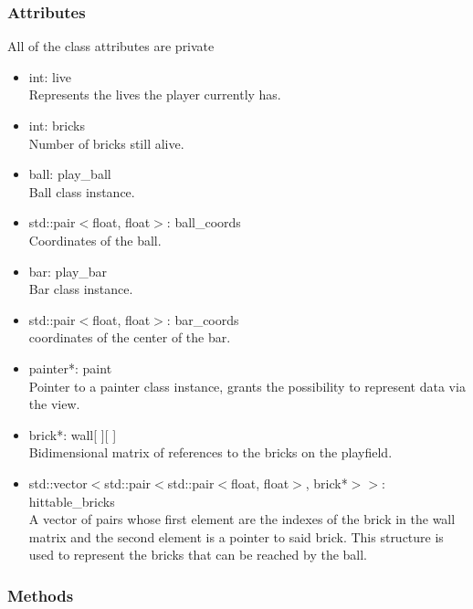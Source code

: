 \documentclass[]{article}
\begin{document}
\subsubsection{Attributes}
All of the class attributes are private
	\begin{itemize}
		\item int: live \\Represents the lives the player currently has.
		\item int: bricks \\Number of bricks still alive.
		\item ball: play\_ball \\Ball class instance.
		\item std::pair$<$float, float$>$: ball\_coords\\Coordinates of the ball.
		\item bar: play\_bar\\Bar class instance.
		\item std::pair$<$float, float$>$: bar\_coords\\coordinates of the center of the bar.
		\item painter*: paint \\ Pointer to a painter class instance, grants the possibility to represent data via the view.
		\item brick*: wall[ ][ ] \\Bidimensional matrix of references to the bricks on the playfield.
		\item std::vector$<$std::pair$<$std::pair$<$float, float$>$, brick*$>$$>$: hittable\_bricks \\ A vector of pairs whose first element are the indexes of the brick in the wall matrix and the second element is a pointer to said brick. This structure is used to represent the bricks that can be reached by the ball.
	\end{itemize}

\subsubsection{Methods}
\end{document}

